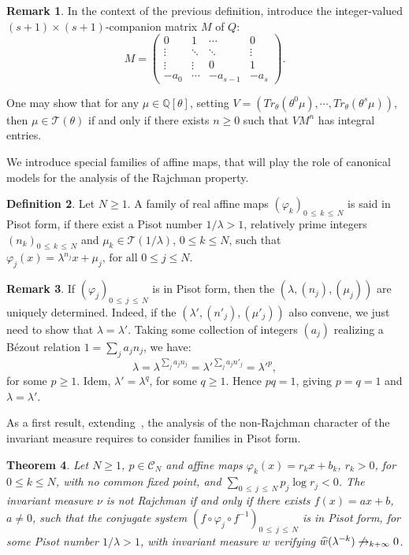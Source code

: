 \documentclass[10pt]{amsart}
\newtheorem{theo}{Theorem}[section]
\theoremstyle{definition}\newtheorem{defi}[theo]{Definition}\newtheorem{rema}[theo]{Remark}\newtheorem{exam}[theo]{Example}\newtheorem{exem}[theo]{Example}\newtheorem{nota}[theo]{Notation}
\newcommand{\Qbb}{\mathbb Q}
\newcommand{\Ccl}{\mathcal{C}}
\newcommand{\Tcl}{\mathcal{T}}
\let\oldhat\hat
\renewcommand*{\hat}[1]{\mathchoice{\widehat{#1}}{\widehat{#1}}{\oldhat{#1}}{\oldhat{#1}}}
\begin{document}
\begin{rema}
In the context of the previous definition, introduce the integer-valued $(s+1)\times(s+1)$-companion matrix $M$ of $Q$:
\[
M=\left(
\begin{matrix}
0&1&\cdots&0\\
\vdots&\ddots&\ddots&\vdots\\
\vdots&\vdots&0&1\\
-a_0&\cdots&-a_{s-1}&-a_s
\end{matrix}
\right).
\]


One may show that for any $\mu\in\Qbb[\theta]$, setting $V=(Tr_{\theta}(\theta^0\mu),\cdots,Tr_{\theta}(\theta^s\mu))$, then $\mu\in {\Tcl}(\theta)$ if and only if there exists $n\geq0$ such that $VM^n$ has integral entries.
\end{rema}

We introduce special families of affine maps, that will play the role of canonical models for the analysis of the Rajchman property.

\begin{defi}
Let $N\geq1$. A family of real affine maps $(\varphi_k)_{0\,\leq\,k\,\leq\,N}$ is said in Pisot form, if there exist a Pisot number $1/\lambda>1$, relatively prime integers $(n_k)_{0\,\leq\,k\,\leq\,N}$ and $\mu_k\in {\Tcl}(1/\lambda)$, $0\leq k\leq N$, such that $\varphi_j(x)=\lambda^{n_j}x+\mu_j\text{, for all }0\leq j\leq N$.
\end{defi}


\begin{rema}
If $(\varphi_j)_{0\,\leq\,j\,\leq\,N}$ is in Pisot form, then the $(\lambda,(n_j),(\mu_j))$ are uniquely determined. Indeed, if the $(\lambda',(n'_j),(\mu'_j))$ also convene, we just need to show that $\lambda=\lambda'$. Taking some collection of integers $(a_j)$ realizing a Bézout relation $1=\sum_j a_jn_j$, we have:
\[
\lambda=\lambda^{\sum_ja_jn_j}=\lambda'^{\sum_ja_jn'_j}=\lambda'^p,
\]
for some $p\geq1$. Idem, $\lambda'=\lambda^q$, for some $q\geq1$. Hence $pq=1$, giving $p=q=1$ and $\lambda=\lambda'$.
\end{rema}

As a first result, extending~\cite{salem}, the analysis of the non-Rajchman character of the invariant measure requires to consider families in Pisot form.

\begin{theo}\label{part1}
Let $N\geq 1$, $p\in{\Ccl}_N$ and affine maps $\varphi_k(x)=r_kx+b_k$, $r_k>0$, for $0\leq k\leq N$, with no common fixed point, and $\sum_{0\,\leq\,j\,\leq\,N}p_j\log r_j<0$. The invariant measure $\nu$ is not Rajchman if and only if there exists $f(x)=ax+b$, $a\not=0$, such that the conjugate system $(f\circ \varphi_j\circ f^{-1})_{0\,\leq\,j\,\leq\,N}$ is in Pisot form, for some Pisot number $1/\lambda>1$, with invariant measure $w$ verifying $\hat{w}(\lambda^{-k})\not\rightarrow_{k+\infty}0$.
\end{theo}
\end{document}
